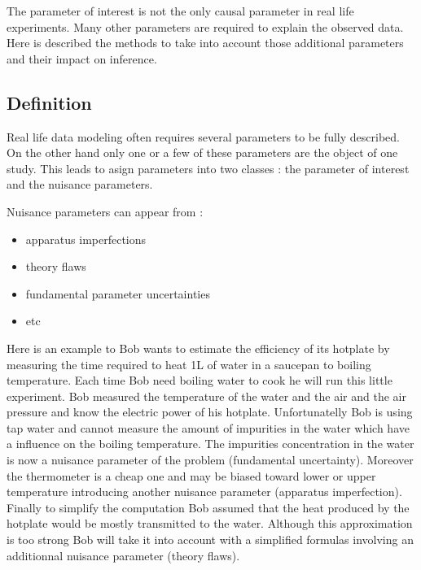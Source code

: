 
The parameter of interest is not the only causal parameter in real life experiments.
Many other parameters are required to explain the observed data.
Here is described the methods to take into account those additional parameters and their impact on inference. 





\subsection{Definition} %
\label{sub:definition}

Real life data modeling often requires several parameters to be fully described.
On the other hand only one or a few of these parameters are the object of one study.
This leads to asign parameters into two classes : the parameter of interest and the nuisance parameters.

Nuisance parameters can appear from :
\begin{itemize}
	\item apparatus imperfections
	\item theory flaws
	\item fundamental parameter uncertainties
	\item etc
\end{itemize}

Here is an example to 
Bob wants to estimate the efficiency of its hotplate by measuring the time required to heat 1L of water in a saucepan to boiling temperature.
Each time Bob need boiling water to cook he will run this little experiment.
Bob measured the temperature of the water and the air and the air pressure and know the electric power of his hotplate.
Unfortunatelly Bob is using tap water and cannot measure the amount of impurities in the water which have a influence on the boiling temperature.
The impurities concentration in the water is now a nuisance parameter of the problem (fundamental uncertainty).
Moreover the thermometer is a cheap one and may be biased toward lower or upper temperature introducing another nuisance parameter (apparatus imperfection).
Finally to simplify the computation Bob assumed that the heat produced by the hotplate would be mostly transmitted to the water.
Although this approximation is too strong Bob will take it into account with a simplified formulas involving an additionnal nuisance parameter (theory flaws).

